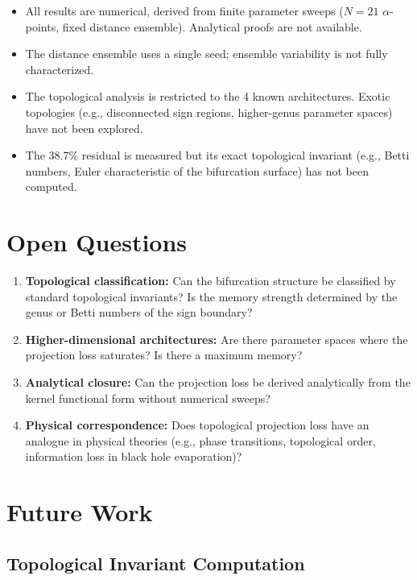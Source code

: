 \documentclass[11pt,a4paper,oneside]{report}
\begin{document}
\begin{itemize}[nosep]
  \item All results are numerical, derived from finite parameter sweeps
    ($N=21$ $\alpha$-points, fixed distance ensemble). Analytical proofs
    are not available.
  \item The distance ensemble uses a single seed; ensemble variability
    is not fully characterized.
  \item The topological analysis is restricted to the 4 known architectures.
    Exotic topologies (e.g., disconnected sign regions, higher-genus
    parameter spaces) have not been explored.
  \item The 38.7\% residual is measured but its exact topological invariant
    (e.g., Betti numbers, Euler characteristic of the bifurcation surface)
    has not been computed.
\end{itemize}

\section{Open Questions}

\begin{enumerate}[nosep]
  \item \textbf{Topological classification:} Can the bifurcation structure
    be classified by standard topological invariants? Is the memory strength
    determined by the genus or Betti numbers of the sign boundary?
  \item \textbf{Higher-dimensional architectures:} Are there parameter spaces
    where the projection loss saturates? Is there a maximum memory?
  \item \textbf{Analytical closure:} Can the projection loss be derived
    analytically from the kernel functional form without numerical sweeps?
  \item \textbf{Physical correspondence:} Does topological projection loss
    have an analogue in physical theories (e.g., phase transitions, topological
    order, information loss in black hole evaporation)?
\end{enumerate}

\section{Future Work}

\subsection{Topological Invariant Computation}
\end{document}
